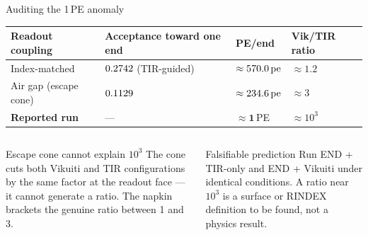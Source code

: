\documentclass[aspectratio=169,9pt]{beamer}
\begin{document}
\begin{frame}{Auditing the 1\,PE anomaly}
  \begin{center}
  {\footnotesize
  \setlength{\tabcolsep}{4pt}
  \begin{tabular}{@{}p{3.5cm}p{3.4cm}p{2.0cm}p{2.0cm}@{}}
    \toprule
    Readout coupling & Acceptance toward one end & PE/end & Vik/TIR ratio\\
    \midrule
    Index-matched & $0.2742$ (TIR-guided) & $\approx570.0\,\text{pe}$ & $\approx 1.2$\\
    Air gap (escape cone) & $0.1129$ & $\approx234.6\,\text{pe}$ & $\approx 3$\\
    \rowcolor{rowhl}
    \textbf{Reported run} & — & $\approx\mathbf{1}$\,PE & $\approx 10^3$\\
    \bottomrule
  \end{tabular}}
  \end{center}
  \vspace{4pt}
  \begin{columns}[T]
      \begin{block}{Escape cone cannot explain $10^3$}
        {\small The cone cuts both Vikuiti and TIR configurations by
        the same factor at the readout face — it cannot generate a ratio.
        The napkin brackets the genuine ratio between 1 and 3.}
      \end{block}
      \begin{alertblock}{Falsifiable prediction}
        {\small Run END + TIR-only and END + Vikuiti under identical conditions.
        A ratio near $10^3$ is a surface or RINDEX definition to be found,
        not a physics result.}
      \end{alertblock}
  \end{columns}
\end{frame}
\end{document}

